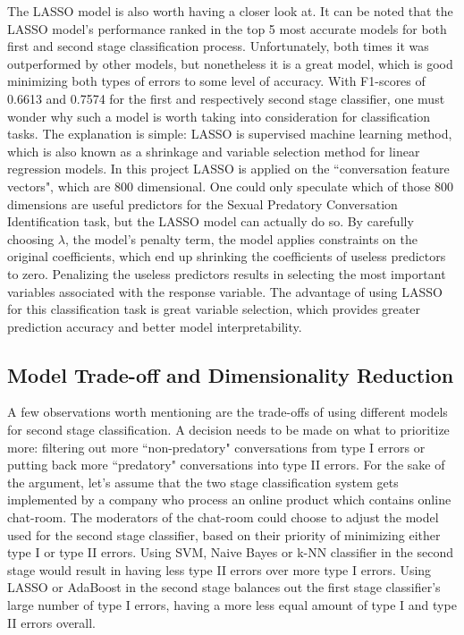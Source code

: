 \documentclass[11pt]{article}
\begin{document}
The LASSO model is also worth having a closer look at. It can be noted that the LASSO model's performance ranked in the top 5 most accurate models for both first and second stage classification process. Unfortunately, both times it was outperformed by other models, but nonetheless it is a great model, which is good minimizing both types of errors to some level of accuracy. With F1-scores of 0.6613 and 0.7574 for the first and respectively second stage classifier, one must wonder why such a model is worth taking into consideration for classification tasks. The explanation is simple: LASSO is supervised machine learning method, which is also known as a shrinkage and variable selection method for linear regression models. In this project LASSO is applied on the ``conversation feature vectors", which are 800 dimensional. One could only speculate which of those 800 dimensions are useful predictors for the Sexual Predatory Conversation Identification task, but the LASSO model can actually do so. By carefully choosing $\lambda$, the model's penalty term, the model applies constraints on the original coefficients, which end up shrinking the coefficients of useless predictors to zero. Penalizing the useless predictors results in selecting the most important variables associated with the response variable. The advantage of using LASSO for this classification task is great variable selection, which provides greater prediction accuracy and better model interpretability.

\subsection{Model Trade-off and Dimensionality Reduction}
A few observations worth mentioning are the trade-offs of using different models for second stage classification. A decision needs to be made on what to prioritize more: filtering out more ``non-predatory" conversations from type I errors or putting back more ``predatory" conversations into type II errors. For the sake of the argument, let's assume that the two stage classification system gets implemented by a company who process an online product which contains online chat-room. The moderators of the chat-room could choose to adjust the model used for the second stage classifier, based on their priority of minimizing either type I or type II errors. Using SVM, Naive Bayes or k-NN classifier in the second stage would result in having less type II errors over more type I errors. Using LASSO or AdaBoost in the second stage balances out the first stage classifier's large number of type I errors, having a more less equal amount of type I and type II errors overall.
\end{document}
